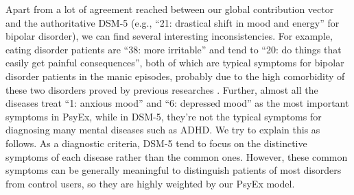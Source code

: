 Apart from a lot of agreement reached between our global contribution vector and the authoritative DSM-5 (e.g., ``21: drastical shift in mood and energy'' for bipolar disorder), we can find several interesting inconsistencies. For example, eating disorder patients are ``38: more irritable'' and tend to ``20: do things that easily get painful consequences'', both of which are typical symptoms for bipolar disorder patients in the manic episodes, probably due to the high comorbidity of these two disorders proved by previous researches \cite{LUNDE2009relation, Ruiz2015Comorbidity}. 
Further, almost all the diseases treat ``1: anxious mood'' and ``6: depressed mood'' as the most important symptoms in PsyEx, while in DSM-5, they're not the typical symptoms for diagnosing many mental diseases such as ADHD. We try to explain this as follows. As a diagnostic criteria, DSM-5 tend to focus on the distinctive symptoms of each disease rather than the common ones. However, these common symptoms can be generally meaningful to distinguish patients of most disorders from control users, so they are highly weighted by our PsyEx model. 
















